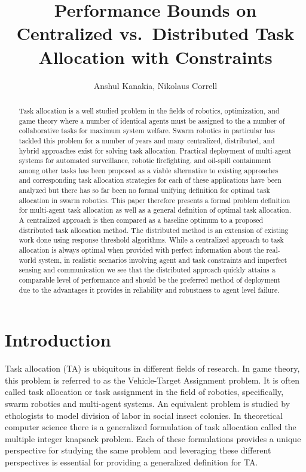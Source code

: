 \documentclass[11pt, onecolumn, compsoc, letterpaper]{article}
\title{Performance Bounds on Centralized vs.~Distributed Task Allocation with Constraints}
\author{Anshul Kanakia, Nikolaus Correll}
\date{}
\begin{document}
\maketitle

\begin{abstract}
Task allocation is a well studied problem in the fields of robotics, optimization, and game theory where a number of identical agents must be assigned to the a number of collaborative tasks for maximum system welfare. Swarm robotics in particular has tackled this problem for a number of years and many centralized, distributed, and hybrid approaches exist for solving task allocation. Practical deployment of multi-agent systems for automated surveillance, robotic firefighting, and oil-spill containment among other tasks has been proposed as a viable alternative to existing approaches and corresponding task allocation strategies for each of these applications have been analyzed but there has so far been no formal unifying definition for optimal task allocation in swarm robotics. This paper therefore presents a formal problem definition for multi-agent task allocation as well as a general definition of optimal task allocation. A centralized approach is then compared as a baseline optimum to a proposed distributed task allocation method. The distributed method is an extension of existing work done using response threshold algorithms. While a centralized approach to task allocation is always optimal when provided with perfect information about the real-world system, in realistic scenarios involving agent and task constraints and imperfect sensing and communication we see that the distributed approach quickly attains a comparable level of performance and should be the preferred method of deployment due to the advantages it provides in reliability and robustness to agent level failure.
\end{abstract}

\section{Introduction}
Task allocation (TA) is ubiquitous in different fields of research. In game theory, this problem is referred to as the Vehicle-Target Assignment problem. It is often called task allocation or task assignment in the field of robotics, specifically, swarm robotics and multi-agent systems. An equivalent problem is studied by ethologists to model division of labor in social insect colonies. In theoretical computer science there is a generalized formulation of task allocation called the multiple integer knapsack problem. Each of these formulations provides a unique perspective for studying the same problem and leveraging these different perspectives is essential for providing a generalized definition for TA. 
\end{document}
